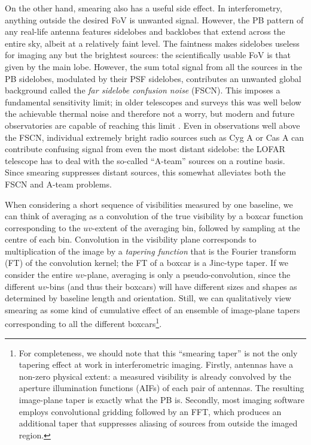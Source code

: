 \documentclass[useAMS,usenatbib]{mn2e}
\begin{document}
On the other hand, smearing also has a useful side effect. In interferometry, anything outside the desired FoV is unwanted 
signal. However, the PB pattern of any real-life antenna features sidelobes and backlobes 
that extend across the entire sky, albeit at a relatively faint level. The faintness makes sidelobes useless for imaging any 
but the brightest sources: the scientifically usable FoV is that given by the main lobe. However, the 
sum total signal from all the sources in the PB sidelobes, modulated by their PSF sidelobes, contributes an unwanted global 
background called the \emph{far sidelobe confusion noise} (FSCN). This imposes a fundamental sensitivity limit; in older 
telescopes and surveys this was well below the achievable thermal noise and therefore not a worry, but modern and future 
observatories are capable of reaching this limit \citep{Smirnov-FSCN}. Even in observations well above the FSCN, 
individual extremely bright radio sources such as Cyg A or Cas A can contribute confusing signal from even the most distant 
sidelobe: the LOFAR telescope \citep{LOFAR} has to deal with the so-called ``A-team'' sources on a routine basis. Since 
smearing suppresses distant sources, this somewhat alleviates both the FSCN and A-team problems.

When considering a short sequence of visibilities measured by one baseline, we can think of averaging as a convolution of the 
true visibility by a boxcar function corresponding to the $uv$-extent of the averaging bin, followed by sampling at the 
centre of each bin. Convolution in the visibility plane corresponds to multiplication of the image by a \emph{tapering function} 
that is the Fourier transform (FT) of the convolution kernel; the FT of a boxcar is a Jinc-type taper. If
we consider the entire $uv$-plane, averaging is only a pseudo-convolution, since the different $uv$-bins (and thus
their boxcars) will have different sizes and shapes as determined by baseline length and orientation. Still, we can 
qualitatively view smearing  as some kind of cumulative effect of an ensemble of image-plane tapers corresponding to all the 
different boxcars\footnote{For completeness, we should note that  this ``smearing taper'' is not the only tapering effect 
at work in interferometric imaging. Firstly, antennas have a non-zero 
physical extent: a measured visibility is already convolved by the aperture illumination functions (AIFs) of each pair of 
antennas. The resulting image-plane taper is exactly what the PB is. Secondly, most imaging software employs 
convolutional gridding followed by an FFT, which produces an additional taper that suppresses aliasing of sources from 
outside the imaged region.}. 
\end{document}

